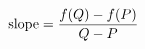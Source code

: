 \documentclass[preview]{standalone}
\begin{document}
\begin{align*}
\special{dvisvgm:raw <g id='unique000'>}\text{slope} = \frac{f(Q) - f(P)}{Q-P}\special{dvisvgm:raw </g>}
\end{align*}
\end{document}
